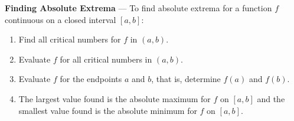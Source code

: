 \documentclass{book}
\begin{document}
\textbf{Finding Absolute Extrema} --- To find absolute extrema for a function $f$ continuous on a closed interval $[a,b]$:
\begin{enumerate}
\item Find all critical numbers for $f$ in $(a,b)$.

\item Evaluate $f$ for all critical numbers in $(a,b)$.

\item Evaluate $f$ for the endpoints $a$ and $b$, that is, determine $f(a)$ and $f(b)$.

\item The largest value found is the absolute maximum for $f$ on $[a,b]$ and the smallest value found is the absolute minimum for $f$ on $[a,b]$.
\end{enumerate}
\end{document}
